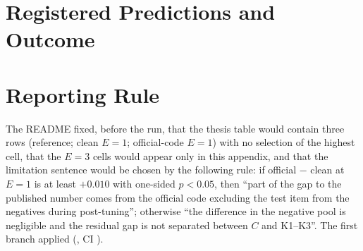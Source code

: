 \section{Registered Predictions and Outcome}

\begin{table}[htbp]
  \caption{The five predictions registered before the run and their outcome. A1 was judged on
  the mean with its confidence interval; under Pratt's treatment of ties the rank test points
  the other way (Section~\ref{sec:res-pfedrec}).}
  \label{tab:predictions}
  \centering\small
  \fittable{}
\end{table}

\section{Reporting Rule}

The README fixed, before the run, that the thesis table would contain three rows (reference;
clean $E=1$; official-code $E=1$) with no selection of the highest cell, that the $E=3$ cells
would appear only in this appendix, and that the limitation sentence would be chosen by the
following rule: if official $-$ clean at $E=1$ is at least $+0.010$ with one-sided $p<0.05$,
then ``part of the gap to the published number comes from the official code excluding the test
item from the negatives during post-tuning''; otherwise ``the difference in the negative pool is
negligible and the residual gap is not separated between $C$ and K1--K3''. The first branch
applied (\PtContrastEOne, CI \PtContrastEOneCi).
